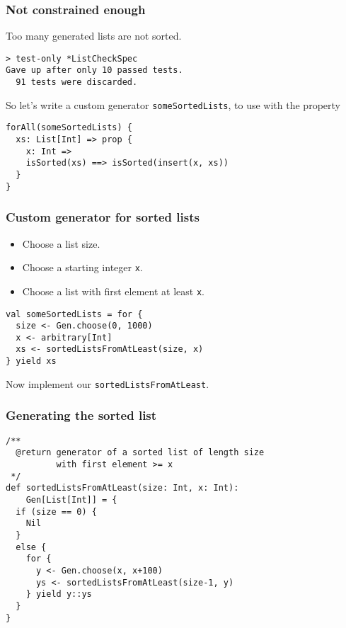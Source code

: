\documentclass{beamer}
\begin{document}
\begin{frame}[fragile]
  \frametitle{Not constrained enough}

  Too many generated lists are not sorted.

  \begin{verbatim}
> test-only *ListCheckSpec
Gave up after only 10 passed tests.
  91 tests were discarded.
  \end{verbatim}

  So let's write a custom generator \texttt{someSortedLists}, to use with the property
  \begin{verbatim}
forAll(someSortedLists) {
  xs: List[Int] => prop {
    x: Int =>
    isSorted(xs) ==> isSorted(insert(x, xs))
  }
}
  \end{verbatim}
\end{frame}

\begin{frame}[fragile]
  \frametitle{Custom generator for sorted lists}

  \begin{itemize}
    \item Choose a list size.
    \item Choose a starting integer \texttt{x}.
    \item Choose a list with first element at least \texttt{x}.
  \end{itemize}

  \begin{verbatim}
val someSortedLists = for {
  size <- Gen.choose(0, 1000)
  x <- arbitrary[Int]
  xs <- sortedListsFromAtLeast(size, x)
} yield xs
  \end{verbatim}

  Now implement our \texttt{sortedListsFromAtLeast}.
\end{frame}

\begin{frame}[fragile]
  \frametitle{Generating the sorted list}

  \begin{verbatim}
/**
  @return generator of a sorted list of length size
          with first element >= x
 */
def sortedListsFromAtLeast(size: Int, x: Int):
    Gen[List[Int]] = {
  if (size == 0) {
    Nil
  }
  else {
    for {
      y <- Gen.choose(x, x+100)
      ys <- sortedListsFromAtLeast(size-1, y)
    } yield y::ys
  }
}
  \end{verbatim}
\end{frame}
\end{document}
